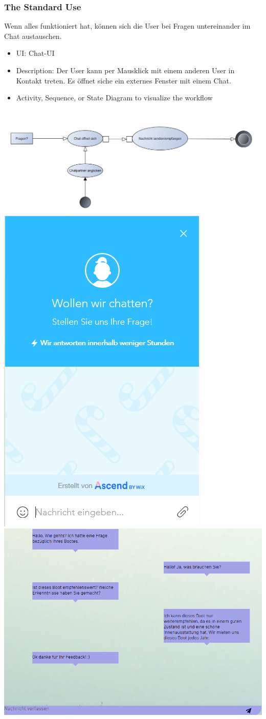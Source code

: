 \documentclass[12pt]{article}
\theoremstyle{definition}
\begin{document}
\subsubsection{The Standard Use}
Wenn alles funktioniert hat, können sich die User bei Fragen untereinander im Chat austauschen.
\begin{itemize}
	\item UI: Chat-UI
	\item Description: Der User kann per Mausklick mit einem anderen User in Kontakt treten. Es öffnet siche ein externes Fenster mit einem Chat. 
	\item Activity, Sequence, or State Diagram to visualize the workflow
\end{itemize}
\includegraphics[height=0.40\textwidth]{Chatten.PNG}
\includegraphics[height=0.40\textwidth]{SupportChat.PNG}
\includegraphics[height=0.40\textwidth]{Chat.PNG}
\end{document}
